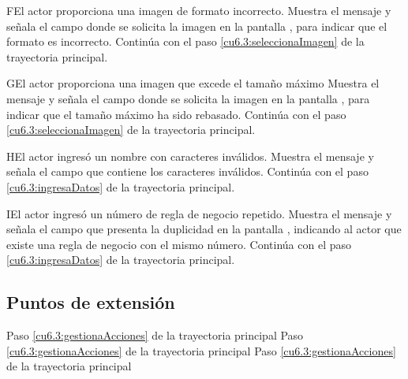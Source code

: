  \begin{UCtrayectoriaA}{F}{El actor proporciona una imagen de formato incorrecto.}
    \UCpaso[\UCsist] Muestra el mensaje  y señala el campo donde se solicita la imagen
    en la pantalla , para indicar que el formato es incorrecto.
    \UCpaso[] Continúa con el paso \ref{cu6.3:seleccionaImagen} de la trayectoria principal.
 \end{UCtrayectoriaA}
 
 \begin{UCtrayectoriaA}{G}{El actor proporciona una imagen que excede el tamaño máximo}
    \UCpaso[\UCsist] Muestra el mensaje  y señala el campo donde se solicita la imagen
    en la pantalla , para indicar que el tamaño máximo ha sido rebasado.
    \UCpaso[] Continúa con el paso \ref{cu6.3:seleccionaImagen} de la trayectoria principal.
 \end{UCtrayectoriaA}
 
 \begin{UCtrayectoriaA}{H}{El actor ingresó un nombre con caracteres inválidos.}
    \UCpaso[\UCsist] Muestra el mensaje  y señala el campo que contiene los caracteres inválidos.
    \UCpaso[] Continúa con el paso \ref{cu6.3:ingresaDatos} de la trayectoria principal.
 \end{UCtrayectoriaA}
 \begin{UCtrayectoriaA}{I}{El actor ingresó un número de regla de negocio repetido.}
    \UCpaso[\UCsist] Muestra el mensaje  y señala el campo que presenta la duplicidad en la pantalla 
	    , indicando al actor que existe una regla de negocio con el mismo número.
    \UCpaso[] Continúa con el paso \ref{cu6.3:ingresaDatos} de la trayectoria principal.
 \end{UCtrayectoriaA}

\subsection{Puntos de extensión}

	{Paso \ref{cu6.3:gestionaAcciones} de la trayectoria principal}
	{}
	{Paso \ref{cu6.3:gestionaAcciones} de la trayectoria principal}
	{}	
	{Paso \ref{cu6.3:gestionaAcciones} de la trayectoria principal}
	{}